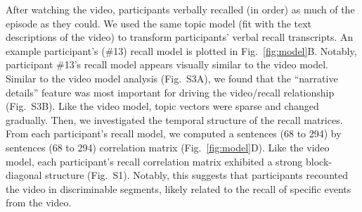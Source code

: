 \documentclass{article}
\begin{document}
After watching the video, participants verbally recalled (in order) as much of the episode as they could.  We used the same topic model (fit with the text descriptions of the video) to transform participants' verbal recall transcripts. An example participant's (\#13) recall model is plotted in Fig.~\ref{fig:model}B. Notably, participant \#13's recall model appears visually similar to the video model. Similar to the video model analysis (Fig.~S3A), we found that the ``narrative details'' feature was most important for driving the video/recall relationship (Fig.~S3B).  Like the video model, topic vectors were sparse and changed gradually.  Then, we investigated the temporal structure of the recall matrices. From each participant's recall model, we computed a sentences (68 to 294) by sentences (68 to 294) correlation matrix (Fig.~\ref{fig:model}D). Like the video model, each participant's recall correlation matrix exhibited a strong block-diagonal structure (Fig.~S1). Notably, this suggests that participants recounted the video in discriminable segments, likely related to the recall of specific events from the video.
\end{document}
